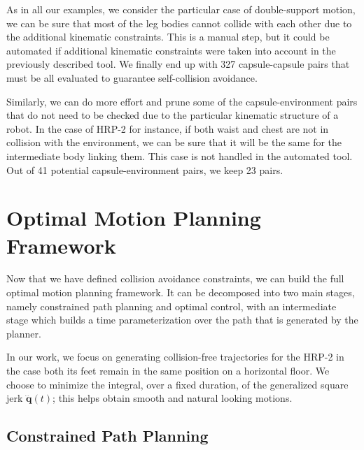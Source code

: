 As in all our examples, we consider the particular case of
double-support motion, we can be sure that most of the leg bodies
cannot collide with each other due to the additional kinematic
constraints. This is a manual step, but it could be automated if
additional kinematic constraints were taken into account in the
previously described tool. We finally end up with 327 capsule-capsule
pairs that must be all evaluated to guarantee self-collision
avoidance.

Similarly, we can do more effort and prune some of the
capsule-environment pairs that do not need to be checked due to the
particular kinematic structure of a robot. In the case of HRP-2 for
instance, if both waist and chest are not in collision with the
environment, we can be sure that it will be the same for the
intermediate body linking them. This case is not handled in the
automated tool. Out of 41 potential capsule-environment pairs, we keep
23 pairs.

\section{Optimal Motion Planning Framework}
\label{sec:chap3-omp-framework}

Now that we have defined collision avoidance constraints, we can build
the full optimal motion planning framework. It can be decomposed into
two main stages, namely constrained path planning and optimal control,
with an intermediate stage which builds a time parameterization over
the path that is generated by the planner.

In our work, we focus on generating collision-free trajectories for
the HRP-2 in the case both its feet remain in the same position on a
horizontal floor. We choose to minimize the integral, over a fixed
duration, of the generalized square jerk $\dddot{\mathbf{q}}(t)$; this
helps obtain smooth and natural looking motions.

\subsection{Constrained Path Planning}
\label{subsec:chap3-path-planning}

